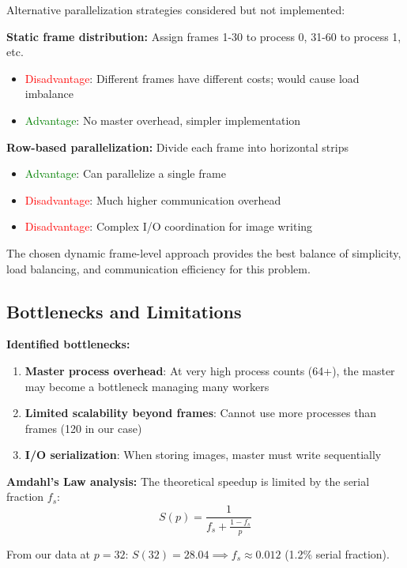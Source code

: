 \documentclass[11pt,a4paper]{article}
\begin{document}
	Alternative parallelization strategies considered but not implemented:
	
	\textbf{Static frame distribution:} Assign frames 1-30 to process 0, 31-60 to process 1, etc.
	\begin{itemize}
		\item \textcolor{red}{Disadvantage}: Different frames have different costs; would cause load imbalance
		\item \textcolor{green}{Advantage}: No master overhead, simpler implementation
	\end{itemize}
	
	\textbf{Row-based parallelization:} Divide each frame into horizontal strips
	\begin{itemize}
		\item \textcolor{green}{Advantage}: Can parallelize a single frame
		\item \textcolor{red}{Disadvantage}: Much higher communication overhead
		\item \textcolor{red}{Disadvantage}: Complex I/O coordination for image writing
	\end{itemize}
	
	The chosen dynamic frame-level approach provides the best balance of simplicity, load balancing, and communication efficiency for this problem.
	
	\subsection{Bottlenecks and Limitations}
	
	\textbf{Identified bottlenecks:}
	\begin{enumerate}
		\item \textbf{Master process overhead}: At very high process counts (64+), the master may become a bottleneck managing many workers
		\item \textbf{Limited scalability beyond frames}: Cannot use more processes than frames (120 in our case)
		\item \textbf{I/O serialization}: When storing images, master must write sequentially
	\end{enumerate}
	
	\textbf{Amdahl's Law analysis:}
	The theoretical speedup is limited by the serial fraction $f_s$:
	\begin{equation}
		S(p) = \frac{1}{f_s + \frac{1-f_s}{p}}
	\end{equation}
	
	From our data at $p=32$: $S(32) = 28.04 \implies f_s \approx 0.012$ (1.2\% serial fraction).
	
\end{document}

